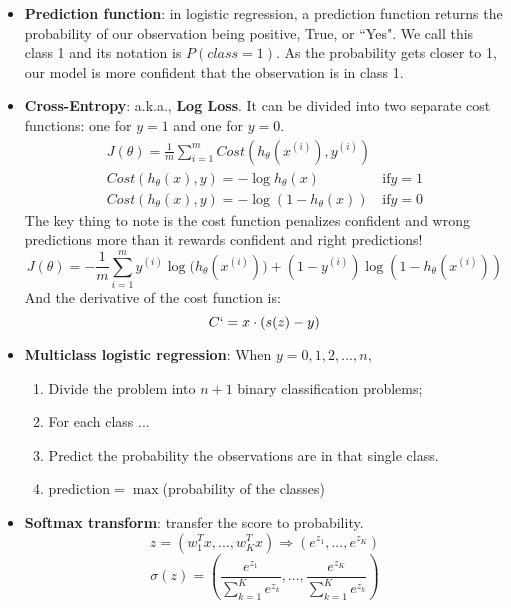 \documentclass[]{article}
\begin{document}
\begin{itemize}
\begin{itemize}
		\item \textbf{Prediction function}: in logistic regression, a prediction function returns the probability of our observation being positive, True, or ``Yes". We call this class 1 and its notation is $P(class=1)$. As the probability gets closer to 1, our model is more confident that the observation is in class 1.
		
		\item \textbf{Cross-Entropy}: a.k.a., \textbf{Log Loss}. It can be divided into two separate cost functions: one for $y=1$ and one for $y=0$.
		\begin{equation}
		\begin{array}{cc}
		J(\theta)=\frac{1}{m}{\sum_{i=1}^{m}{Cost(h_{\theta}(x^{(i)}),y^{(i)})}} &  \\
		Cost(h_{\theta}(x),y) = -\log{h_{\theta}(x)} & \mathrm{if} y=1 \\
		Cost(h_{\theta}(x),y) = -\log{(1-h_{\theta}(x))} & \mathrm{if} y=0
		\end{array}
		\end{equation}
		The key thing to note is the cost function penalizes confident and wrong predictions more than it rewards confident and right predictions!
		\begin{equation}
		J(\theta)=-\frac{1}{m}{\sum_{i=1}^{m}{y^{(i)}\log{(h_{\theta}(x^{(i)})})}+(1-y^{(i)})\log{(1-h_{\theta}(x^{(i)}))}}
		\end{equation}
		And the derivative of the cost function is:
		\begin{equation}
		C`=x\cdot {(s(z)-y)}
		\end{equation}

		\item \textbf{Multiclass logistic regression}: When $y=0,1,2,...,n$,
		\begin{enumerate}
			\item Divide the problem into $n+1$ binary classification problems;
			\item For each class ...
			\item Predict the probability the observations are in that single class.
			\item prediction$=\max{}$(probability of the classes)
		\end{enumerate}
		
		\item \textbf{Softmax transform}: transfer the score to probability.
		\begin{equation}
		z=(w_1^Tx, ..., w_K^Tx)\Rightarrow (e^{z_1}, ..., e^{z_K})
		\end{equation}
		\begin{equation}
		\sigma (z)=\left(\frac{e^{z_1}}{\sum_{k=1}^{K}e^{z_k}}, ...,\frac{e^{z_K}}{\sum_{k=1}^{K}e^{z_k}} \right)
		\end{equation}
		

\end{itemize}
\end{itemize}
\end{document}
